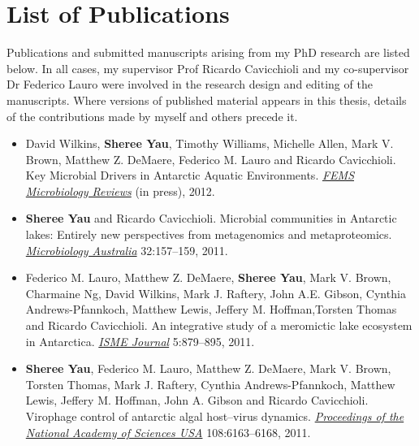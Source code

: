 \chapter*{List of Publications}
Publications and submitted manuscripts arising from my PhD research are listed below.
In all cases, my supervisor Prof Ricardo Cavicchioli and my co-supervisor Dr Federico Lauro were
involved in the research design and editing of the manuscripts.
Where versions of published material appears in this thesis, details of the contributions made by myself and others precede it.

\begin{itemize}

\item David Wilkins, \textbf{Sheree Yau}, Timothy Williams, Michelle Allen, Mark V. Brown, Matthew Z. DeMaere, Federico M. Lauro and Ricardo Cavicchioli.
Key Microbial Drivers in Antarctic Aquatic Environments.
\emph{\underline{FEMS Microbiology Reviews}}
(in press), 2012.

\item \textbf{Sheree Yau} and Ricardo Cavicchioli. 
Microbial communities in Antarctic lakes: Entirely new perspectives from metagenomics and metaproteomics. 
\emph{\underline{Microbiology Australia}} 
32:157--159, 2011.

\item Federico M. Lauro, Matthew Z. DeMaere, \textbf{Sheree Yau}, Mark V. Brown, Charmaine Ng, David Wilkins, Mark J. Raftery, John A.E. Gibson, Cynthia Andrews-Pfannkoch, Matthew Lewis, Jeffery M. Hoffman,Torsten Thomas and Ricardo Cavicchioli. 
An integrative study of a meromictic lake ecosystem in Antarctica. 
\emph{\underline{ISME Journal}}
5:879--895, 2011.

\item \textbf{Sheree Yau}, Federico M. Lauro, Matthew Z. DeMaere, Mark V. Brown, Torsten Thomas, 
Mark J. Raftery, Cynthia Andrews-Pfannkoch, Matthew Lewis, Jeffery M. Hoffman, John A. Gibson and 
Ricardo Cavicchioli. 
Virophage control of antarctic algal host--virus dynamics. 
\emph{\underline{Proceedings of the National Academy of Sciences USA}}
108:6163--6168, 2011.

\end{itemize}

